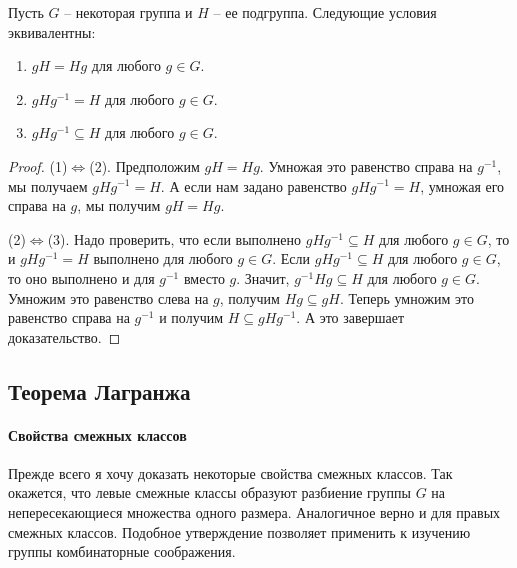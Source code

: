 \begin{claim}
\label{claim::normal_crit}
Пусть $G$ -- некоторая группа и $H$ -- ее подгруппа.
Следующие условия эквивалентны:
\begin{enumerate}
\item $gH = Hg$ для любого $g\in G$.

\item $gHg^{-1} = H$ для любого $g\in G$.

\item $gHg^{-1}\subseteq H$ для любого $g\in G$.
\end{enumerate}
\end{claim}
\begin{proof}
(1)$\Leftrightarrow$(2).
Предположим $gH = Hg$.
Умножая это равенство справа на $g^{-1}$, мы получаем $gH g^{-1} = H$.
А если нам задано равенство $g H g^{-1} = H$, умножая его справа на $g$, мы получим $gH = Hg$.

(2)$\Leftrightarrow$(3).
Надо проверить, что если выполнено $gHg^{-1}\subseteq H$ для любого $g\in G$, то и $gHg^{-1} = H$ выполнено для любого $g\in G$.
Если  $gHg^{-1}\subseteq H$ для любого $g\in G$, то оно выполнено и для $g^{-1}$ вместо $g$.
Значит, $g^{-1}Hg \subseteq H$ для любого $g\in G$.
Умножим это равенство слева на $g$, получим $Hg \subseteq gH$.
Теперь умножим это равенство справа на $g^{-1}$ и получим $H \subseteq gH g^{-1}$.
А это завершает доказательство.
\end{proof}

\subsection{Теорема Лагранжа}

\paragraph{Свойства смежных классов}

Прежде всего я хочу доказать некоторые свойства смежных классов.
Так окажется, что левые смежные классы образуют разбиение группы $G$ на непересекающиеся множества одного размера.
Аналогичное верно и для правых смежных классов.
Подобное утверждение позволяет применить к изучению группы комбинаторные соображения.

